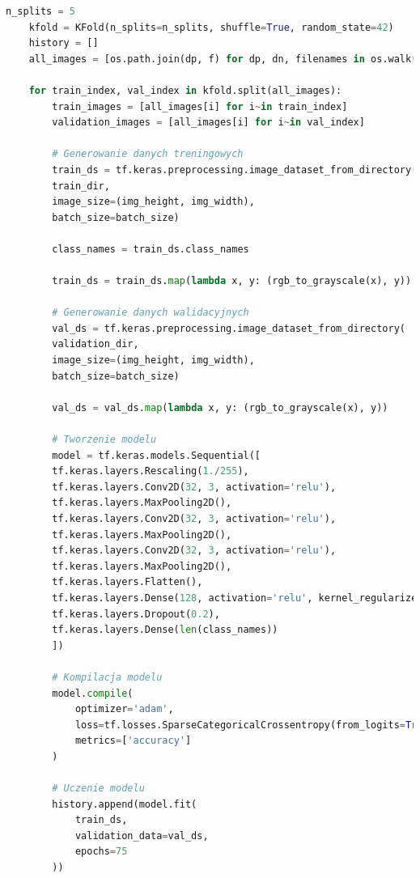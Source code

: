 \begin{lstlisting}[language=Python,caption=Listing skryptu tworzącego model z~walidacją krzyżową
	oraz uczonym na wszystkich wariantach liczby wierzchołków grafów,label={tests-model-1}]
	n_splits = 5
	kfold = KFold(n_splits=n_splits, shuffle=True, random_state=42)
	history = []
	all_images = [os.path.join(dp, f) for dp, dn, filenames in os.walk(data_dir_model) for f in filenames if os.path.splitext(f)[1] == '.png']
  
	for train_index, val_index in kfold.split(all_images):
		train_images = [all_images[i] for i~in train_index]
		validation_images = [all_images[i] for i~in val_index]

		# Generowanie danych treningowych
		train_ds = tf.keras.preprocessing.image_dataset_from_directory(
		train_dir,
		image_size=(img_height, img_width),
		batch_size=batch_size)

		class_names = train_ds.class_names

		train_ds = train_ds.map(lambda x, y: (rgb_to_grayscale(x), y))

		# Generowanie danych walidacyjnych
		val_ds = tf.keras.preprocessing.image_dataset_from_directory(
		validation_dir,
		image_size=(img_height, img_width),
		batch_size=batch_size)

		val_ds = val_ds.map(lambda x, y: (rgb_to_grayscale(x), y))

		# Tworzenie modelu
		model = tf.keras.models.Sequential([
		tf.keras.layers.Rescaling(1./255),
		tf.keras.layers.Conv2D(32, 3, activation='relu'),
		tf.keras.layers.MaxPooling2D(),
		tf.keras.layers.Conv2D(32, 3, activation='relu'),
		tf.keras.layers.MaxPooling2D(),
		tf.keras.layers.Conv2D(32, 3, activation='relu'),
		tf.keras.layers.MaxPooling2D(),
		tf.keras.layers.Flatten(),
		tf.keras.layers.Dense(128, activation='relu', kernel_regularizer=tf.keras.regularizers.l2(0.01)),
		tf.keras.layers.Dropout(0.2),
		tf.keras.layers.Dense(len(class_names))
		])
		
		# Kompilacja modelu
		model.compile(
			optimizer='adam',
			loss=tf.losses.SparseCategoricalCrossentropy(from_logits=True),
			metrics=['accuracy']
		)

		# Uczenie modelu
		history.append(model.fit(
			train_ds,
			validation_data=val_ds,
			epochs=75
		))
\end{lstlisting}

